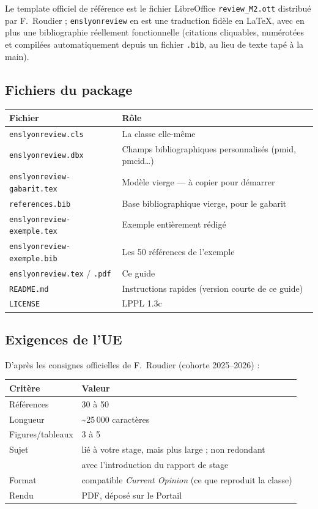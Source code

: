 \documentclass[11pt, a4paper]{article}
\begin{document}
Le template officiel de référence est le fichier LibreOffice
\texttt{review\_M2.ott} distribué par F.~Roudier ; \texttt{enslyonreview}
en est une traduction fidèle en \LaTeX{}, avec en plus une bibliographie
réellement fonctionnelle (citations cliquables, numérotées et compilées
automatiquement depuis un fichier \texttt{.bib}, au lieu de texte
tapé à la main).

\subsection{Fichiers du package}

\begin{center}
\small
\begin{tabular}{@{}ll@{}}
\toprule
\textbf{Fichier} & \textbf{Rôle} \\
\midrule
\texttt{enslyonreview.cls} & La classe elle-même \\
\texttt{enslyonreview.dbx} & Champs bibliographiques personnalisés (pmid, pmcid\ldots) \\
\texttt{enslyonreview-gabarit.tex} & Modèle vierge — à copier pour démarrer \\
\texttt{references.bib} & Base bibliographique vierge, pour le gabarit \\
\texttt{enslyonreview-exemple.tex} & Exemple entièrement rédigé \\
\texttt{enslyonreview-exemple.bib} & Les 50 références de l'exemple \\
\texttt{enslyonreview.tex} / \texttt{.pdf} & Ce guide \\
\texttt{README.md} & Instructions rapides (version courte de ce guide) \\
\texttt{LICENSE} & LPPL 1.3c \\
\bottomrule
\end{tabular}
\end{center}

\subsection{Exigences de l'UE}

D'après les consignes officielles de F.~Roudier (cohorte 2025–2026) :

\begin{center}
\small
\begin{tabular}{@{}ll@{}}
\toprule
\textbf{Critère} & \textbf{Valeur} \\
\midrule
Références & 30 à 50 \\
Longueur & \textasciitilde 25\,000 caractères \\
Figures/tableaux & 3 à 5 \\
Sujet & lié à votre stage, mais plus large ; non redondant \\
 & avec l'introduction du rapport de stage \\
Format & compatible \emph{Current Opinion} (ce que reproduit la classe) \\
Rendu & PDF, déposé sur le Portail \\
\bottomrule
\end{tabular}
\end{center}
\end{document}
